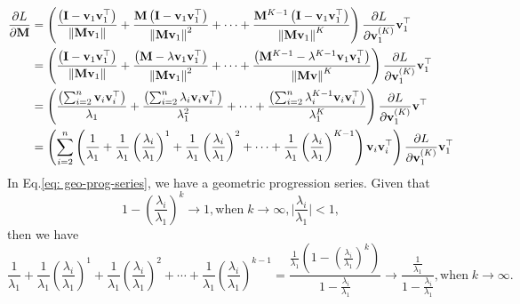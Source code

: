 	\begin{equation}
	\begin{aligned} 
	\frac{\partial L}{\partial \mathbf{M}}
	& =\left( \frac{\left(\mathbf{I}-\mathbf{v}_1 \mathbf{v}_1^{\top}\right)}{\left\|\mathbf{M} \mathbf{v}_1\right\|}  +
	 \frac{\mathbf{M} \left(\mathbf{I}-\mathbf{v}_1 \mathbf{v}_1^{\top}\right)}{\left\|\mathbf{M} \mathbf{v}_1\right\|^{2}}  + \cdots +
	 \frac{\mathbf{M}^{K-1} \left(\mathbf{I}-\mathbf{v}_1 \mathbf{v}_1^{\top}\right)}{\left\|\mathbf{M} \mathbf{v}_1\right\|^{K}} \right)
	 \frac{\partial L}{\partial \mathbf{v}_1^{(K)}}\mathbf{v}_1^{\top} \\
	&=\left( \frac{\left(\mathbf{I}-\mathbf{v}_1 \mathbf{v}_1^{\top}\right)}{\left\|\mathbf{M} \mathbf{v}_1\right\|} +
	\frac{\left(\mathbf{M}-\lambda \mathbf{v}_1 \mathbf{v}_1^{\top}\right)}{\left\|\mathbf{M} \mathbf{v}_1\right\|^2}  + \cdots +
	\frac{\left(\mathbf{M}^{K-1} - \lambda^{K-1}\mathbf{v}_1\mathbf{v}_1^{\top}\right)}{\left\|\mathbf{M} \mathbf{v}\right\|^{K}} \right) \frac{\partial L}{\partial \mathbf{v}_1^{(K)}} \mathbf{v}_1^{\top}\\
	&=\left( \frac{\left(\sum_{i=2}^{n}\mathbf{v}_{i}\mathbf{v}_{i}^{\top}\right)}{\lambda_1}      +
	\frac{\left(\sum_{i=2}^{n}\lambda_{i}\mathbf{v}_{i}\mathbf{v}_{i}^{\top}\right)}{ \lambda_{1}^{2}} +  \cdots +
	\frac{\left(\sum_{i=2}^{n}\lambda_{i}^{K-1}\mathbf{v}_{i}\mathbf{v}_{i}^{\top}\right)}{\lambda_{1}^{K}} \right) \frac{\partial L}{\partial \mathbf{v}_1^{(K)}}
	\mathbf{v}^{\top}\\
	&=\left(\sum_{i=2}^{n}\left(
	\frac{1}{\lambda_{1}} +
	\frac{1}{\lambda_{1}}\left(\frac{\lambda_{i}}{\lambda_{1}}\right)^{1} +
	\frac{1}{\lambda_{1}}\left(\frac{\lambda_{i}}{\lambda_{1}}\right)^{2} + \cdots +
	\frac{1}{\lambda_{1}}\left(\frac{\lambda_{i}}{\lambda_{1}}\right)^{K-1}
	\right)\mathbf{v}_{i}\mathbf{v}_{i}^{\top}
	\right)\frac{\partial L}{\partial \mathbf{v}_{1}^{(K)}}\mathbf{v}_{1}^{\top}\\
	\end{aligned}
	\label{eq: geo-prog-series}
	\end{equation}
	In Eq.\ref{eq: geo-prog-series}, we have a geometric progression series.
	Given that $${1 - (\frac{\lambda_{i}}{\lambda_{1}})^k \rightarrow 1}, \text{when} \; k\rightarrow\infty, \vert \frac{\lambda_{i}}{\lambda_{1}} \vert<1,$$
	then we have
	\begin{equation}
	\frac{1}{\lambda_{1}} +
	\frac{1}{\lambda_{1}}\left(\frac{\lambda_{i}}{\lambda_{1}}\right)^{1} +
	\frac{1}{\lambda_{1}}\left(\frac{\lambda_{i}}{\lambda_{1}}\right)^{2} + \cdots +
	\frac{1}{\lambda_{1}}\left(\frac{\lambda_{i}}{\lambda_{1}}\right)^{k-1} = \frac{\frac{1}{\lambda_{1}}(1- (\frac{\lambda_{i}}{\lambda_{1}})^k)} {1 - \frac{\lambda_{i}}{\lambda_{1}}} 
	\rightarrow  \frac{\frac{1}{\lambda_{1}}}
	{1 - \frac{\lambda_{i}}{\lambda_{1}}}, \text{when} \; k\rightarrow\infty.
	\label{eq: geo-prog-series-deduction}
	\end{equation}
	
